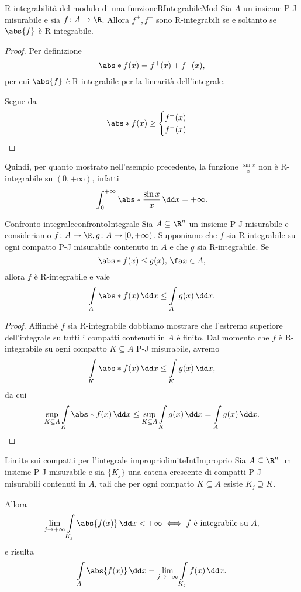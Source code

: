 \begin{prop}{R-integrabilità del modulo di una funzione}{RIntegrabileMod}
	Sia \(A\) un insieme P-J misurabile e sia \(f\colon A \to \R\).
	Allora \(f^+,f^-\) sono R-integrabili se e soltanto se \(\abs{f}\) è R-integrabile.
\end{prop}

\begin{proof}
	\graffito{\(\Rightarrow)\)}Per definizione
	\[
		\abs*{f(x)} = f^+(x)+f^-(x),
	\]
	per cui \(\abs{f}\) è R-integrabile per la linearità dell'integrale.

	\graffito{\(\Leftarrow)\)}Segue da
	\[
		\abs*{f(x)} \ge 	\begin{cases}
			f^+(x) \\
			f^-(x)
		\end{cases}\qedhere
	\]
\end{proof}

\begin{oss}
	Quindi, per quanto mostrato nell'esempio precedente, la funzione \(\frac{\sin x}{x}\) non è R-integrabile su \((0,+\infty)\), infatti
	\[
		\int_0^{+\infty} \abs*{\frac{\sin x}{x}}\,\dd x = +\infty.
	\]
\end{oss}

\begin{prop}{Confronto integrale}{confrontoIntegrale}
	Sia \(A\subseteq\R^n\) un insieme P-J misurabile e consideriamo \(f\colon A\to \R,g\colon A\to [0,+\infty)\).
	Supponiamo che \(f\) sia R-integrabile su ogni compatto P-J misurabile contenuto in \(A\) e che \(g\) sia R-integrabile.
	Se
	\[
		\abs*{f(x)} \le g(x),\,\fa x\in A,
	\]
	allora \(f\) è R-integrabile e vale
	\[
		\int\limits_A \abs*{f(x)}\,\dd x \le \int\limits_A g(x)\,\dd x.
	\]
\end{prop}

\begin{proof}
	Affinchè \(f\) sia R-integrabile dobbiamo mostrare che l'estremo superiore dell'integrale su tutti i compatti contenuti in \(A\) è finito.
	Dal momento che \(f\) è R-integrabile su ogni compatto \(K\subseteq A\) P-J misurabile, avremo
	\[
		\int\limits_K \abs*{f(x)}\,\dd x \le \int\limits_K g(x)\,\dd x,
	\]
	da cui
	\[
		\sup_{K\subseteq A} \int\limits_K \abs*{f(x)}\,\dd x \le \sup_{K\subseteq A} \int\limits_K g(x)\,\dd x = \int\limits_A g(x)\,\dd x.\qedhere
	\]
\end{proof}

\begin{teor}{Limite sui compatti per l'integrale improprio}{limiteIntImproprio}
	Sia \(A\subseteq\R^n\) un insieme P-J misurabile e sia \(\{K_j\}\) una catena crescente di compatti P-J misurabili contenuti in \(A\), tali che per ogni compatto \(K\subseteq A\) esiste \(K_j\supseteq K\).

	Allora
	\[
		\lim_{j\to +\infty} \int\limits_{K_j}\abs{f(x)}\,\dd x <+\infty \iff f \text{ è integrabile su }A,
	\]
	e risulta
	\[
		\int\limits_A \abs{f(x)}\,\dd x = \lim_{j\to +\infty}\int\limits_{K_j}f(x)\,\dd x.
	\]
\end{teor}

